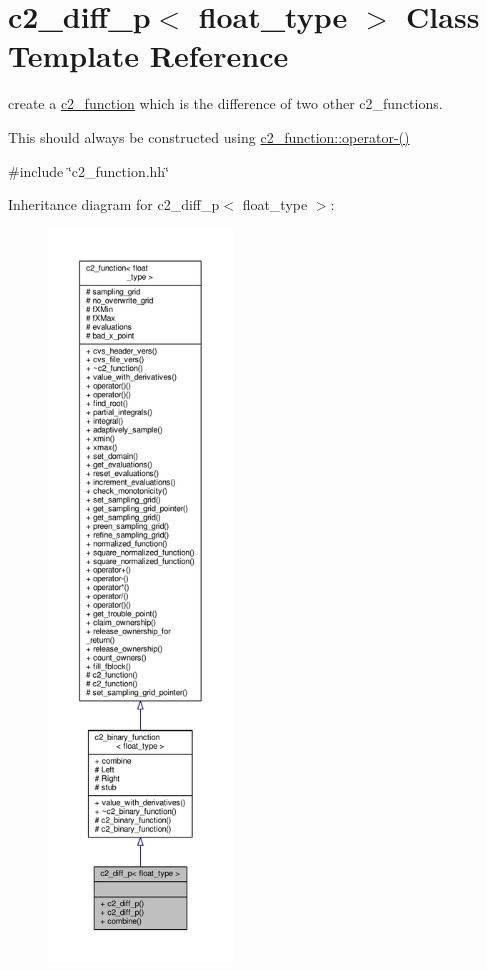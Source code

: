 \hypertarget{classc2__diff__p}{}\section{c2\+\_\+diff\+\_\+p$<$ float\+\_\+type $>$ Class Template Reference}
\label{classc2__diff__p}


create a \hyperlink{classc2__function}{c2\+\_\+function} which is the difference of two other c2\+\_\+functions.

This should always be constructed using \hyperlink{classc2__function_a4c56a4673e00bfad37143c403a0c94c8}{c2\+\_\+function\+::operator-\/()}  




{\ttfamily \#include \char`\"{}c2\+\_\+function.\+hh\char`\"{}}



Inheritance diagram for c2\+\_\+diff\+\_\+p$<$ float\+\_\+type $>$\+:
\nopagebreak
\begin{figure}[H]
\begin{center}
\leavevmode
\includegraphics[height=550pt]{classc2__diff__p__inherit__graph}
\end{center}
\end{figure}


